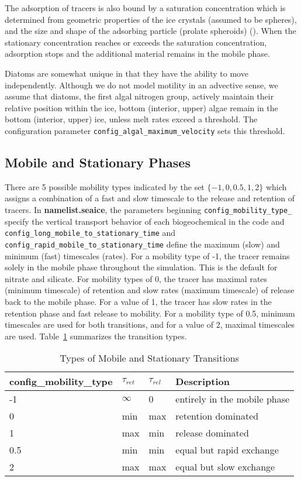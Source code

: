 The adsorption of tracers is also bound by a saturation concentration which is determined from geometric properties of the ice crystals (assumed to be spheres), and the size and shape of the adsorbing particle (prolate spheroids)  (\cite{Johnson:bac:1995}).  When the stationary concentration reaches or exceeds the saturation concentration, adsorption stops and the additional material remains in the mobile phase.

Diatoms are somewhat unique in that they have the ability to move independently. Although we do not model motility in an advective sense, we assume that diatoms, the first
algal nitrogen group, actively maintain their
relative position within the ice, \bgcie bottom (interior, upper) algae
remain in the bottom (interior, upper) ice, unless melt rates exceed a
threshold.  The configuration parameter {\tt config\_algal\_maximum\_velocity} sets this
threshold.

\subsection{Mobile and Stationary Phases}
\label{sec:mobile_and_stationary}
There are 5 possible mobility types indicated by the set $\{-1, 0,
0.5, 1, 2\}$ which assigns a combination of a fast and slow timescale
to the release and retention of tracers.  In {\bf namelist.seaice}, the
parameters beginning {\tt config\_mobility\_type\_} specify the
vertical transport behavior of each biogeochemical in the code and
{\tt config\_long\_mobile\_to\_stationary\_time} and \newline
{\tt config\_rapid\_mobile\_to\_stationary\_time} define the maximum (slow) and minimum (fast)  timescales (rates).  For a mobility type of -1, the tracer remains solely in the mobile
phase throughout the simulation.  This is the default for nitrate and silicate.  For mobility types of 0, the tracer has maximal rates (\bgcie minimum timescale) of retention and slow rates (\bgcie maximum timescale) of release back to the mobile phase.  For a value of 1, the tracer has slow rates in
the retention phase and fast release to mobility.  For a mobility type of 0.5,
minimum timescales are used for both
transitions, and for a value of 2, maximal timescales are used. Table~\ref{table:phases} summarizes the transition types.

\begin{table}[t!]
\caption{Types of Mobile and Stationary Transitions}
\begin{tabular}{l|l|l|l} \hline
{\bf{config\_mobility\_type}} &$ \tau_{ret}$ & $\tau_{rel}$ & Description \\ \hline
-1  & $\infty$ & 0 & entirely in the mobile phase \\
0   & min & max & retention dominated \\
1   & max & min & release dominated \\
0.5   & min & min & equal but rapid exchange \\
2  & max & max & equal but slow exchange \\
\hline
\end{tabular}\label{table:phases}
\end{table}

